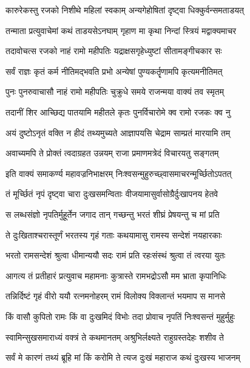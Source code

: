 \twolineshloka
{कारुरेकस्तु रजको निशीथे महिलां स्वकाम्}
{अन्यगेहोषितां दृष्ट्वा धिक्कुर्वन्समताडयत्}%

\twolineshloka
{तन्माता प्रत्युवाचेमां कथं ताडयसेऽनघाम्}
{गृहाण मा कृथा निन्दां स्त्रियं मद्वाक्यमाचर}%

\twolineshloka
{तदावोचत्स रजको नाहं रामो महीपतिः}
{यद्राक्षसगृहेध्युष्टां सीतामङ्गीचकार सः}%

\twolineshloka
{सर्वं राज्ञः कृतं कर्म नीतिमद्भवति प्रभो}
{अन्येषां पुण्यकर्तॄणामपि कृत्यमनीतिमत्}%

\twolineshloka
{पुनः पुनरुवाचासौ नाहं रामो महीपतिः}
{चुक्रुधे समये राजन्मया वाक्यं तव स्मृतम्}%

\twolineshloka
{तदानीं शिर आच्छिद्य पातयामि महीतले}
{कृतः पुनर्विचारोमे क्व रामो रजकः क्व नु}%

\twolineshloka
{अयं दुष्टोऽनृतं वक्ति न हीदं तथ्यमुच्यते}
{आज्ञापयसि चेद्राम साम्प्रतं मारयामि तम्}%

\twolineshloka
{अवाच्यमपि ते प्रोक्तं त्वदाग्रहत उन्नयम्}
{राजा प्रमाणमत्रेदं विचारयतु सङ्गतम्}%


\twolineshloka
{इति वाक्यं समाकर्ण्य महावज्रनिभाक्षरम्}
{निःश्वसन्मुहुरुच्छ्वासमाचरन्मूर्च्छितोऽपतत्}%

\twolineshloka
{तं मूर्च्छितं नृपं दृष्ट्वा चारा दुःखसमन्विताः}
{वीजयामासुर्वासोग्रैर्दुःखापनय हेतवे}%

\twolineshloka
{स लब्धसंज्ञो नृपतिर्मुहूर्तेन जगाद तान्}
{गच्छन्तु भरतं शीघ्रं प्रेषयन्तु च मां प्रति}%

\twolineshloka
{ते दुःखिताश्चरास्तूर्णं भरतस्य गृहं गताः}
{कथयामासु रामस्य सन्देशं नयहारकाः}%

\twolineshloka
{भरतो रामसन्देशं श्रुत्वा धीमान्ययौ सदः}
{रामं प्रति रहःसंस्थं श्रुत्वा तं त्वरया युतः}%

\twolineshloka
{आगत्य तं प्रतीहारं प्रत्युवाच महामनाः}
{कुत्रास्ते रामभद्रोऽसौ मम भ्राता कृपानिधिः}%

\twolineshloka
{तन्निर्दिष्टं गृहं वीरो ययौ रत्नमनोहरम्}
{रामं विलोक्य विक्लान्तं भयमाप स मानसे}%

\twolineshloka
{किं वासौ कुपितो रामः किं वा दुःखमिदं विभोः}
{तदा प्रोवाच नृपतिं निःश्वसन्तं मुहुर्मुहुः}%

\twolineshloka
{स्वामिन्सुखसमाराध्यं वक्त्रं ते कथमानतम्}
{अश्रुभिर्लक्ष्यते राहुग्रस्तदेहः शशीव ते}%

\twolineshloka
{सर्वं मे कारणं तथ्यं ब्रूहि मां किं करोमि ते}
{त्यज दुःखं महाराज कथं दुःखस्य भाजनम्}%

